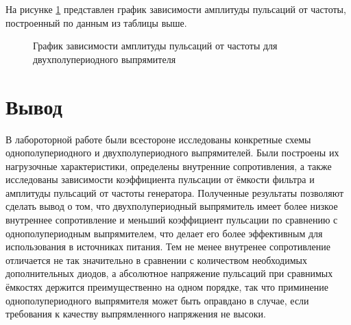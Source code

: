 \documentclass[12pt]{article}
\begin{document}
На рисунке \ref{fig:ripple_frequency_2} представлен график зависимости амплитуды 
пульсаций от частоты, построенный по данным из таблицы выше.

\begin{figure}[H]
\centering
{}
\caption{График зависимости амплитуды пульсаций от частоты для двухполупериодного выпрямителя}
\label{fig:ripple_frequency_2}
\end{figure}

\section*{Вывод}
В лабороторной работе были всестороне исследованы конкретные схемы однополупериодного 
и двухполупериодного выпрямителей. Были построены их нагрузочные характеристики, 
определены внутренние сопротивления, а также исследованы зависимости коэффициента 
пульсации от ёмкости фильтра и амплитуды пульсаций от частоты генератора. Полученные 
результаты позволяют сделать вывод о том, что двухполупериодный выпрямитель имеет 
более низкое внутреннее сопротивление и меньший коэффициент пульсации по сравнению 
с однополупериодным выпрямителем, что делает его более эффективным для использования 
в источниках питания. Тем не менее внутренее сопротивление отличается не так 
значительно в сравнении с количеством необходимых дополнительных диодов, а абсолютное 
напряжение пульсаций при сравнимых ёмкостях держится преимущественно на одном 
порядке, так что приминение однополупериодного выпрямителя может быть оправдано 
в случае, если требования к качеству выпрямленного напряжения не высоки.
\end{document}
